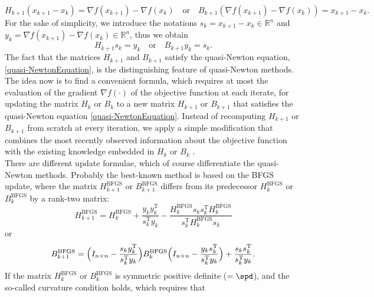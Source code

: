 \begin{equation*}
    H_{k+1} (x_{k+1} - x_k) = \nabla f(x_{k+1}) - \nabla f(x_k) \quad \text{or} \quad B_{k+1} (\nabla f(x_{k+1}) - \nabla f(x_k)) = x_{k+1} - x_k.
\end{equation*}
For the sake of simplicity, we introduce the notations $s_k = x_{k+1} - x_k \in \mathbb{R}^n$ and $y_k = \nabla f(x_{k+1}) - \nabla f(x_k) \in \mathbb{R}^n$, thus we obtain
\begin{equation}\label{quasi-NewtonEquation}
    H_{k+1} s_k = y_k \quad \text{or} \quad B_{k+1} y_k = s_k.
\end{equation}
The fact that the matrices $H_{k+1}$ and $B_{k+1}$ satisfy the quasi-Newton equation, \cref{quasi-NewtonEquation}, is the distinguishing feature of quasi-Newton methods. \\
The idea now is to find a convenient formula, which requires at most the evaluation of the gradient $\nabla f(\cdot)$ of the objective function at each iterate, for updating the matrix $H_k$ or $B_k$ to a new matrix $H_{k+1}$ or $B_{k+1}$ that satisfies the quasi-Newton equation \cref{quasi-NewtonEquation}. Instead of recomputing $H_{k+1}$ or $B_{k+1}$ from scratch at every iteration, we apply a simple modification that combines the most recently observed information about the objective function with the existing knowledge embedded in $H_k$ or $B_k$ \cite[p.~139]{NocedalWright:2006}. \\
There are different update formulae, which of course differentiate the quasi-Newton methods. Probably the best-known method is based on the BFGS update, where the matrix $H^{\mathrm{BFGS}}_{k+1}$ or $B^{\mathrm{BFGS}}_{k+1}$ differs from its predecessor $H^{\mathrm{BFGS}}_k$ or $B^{\mathrm{BFGS}}_k$ by a rank-two matrix:
\begin{equation}\label{DirectBFGSformula}
    H^{\mathrm{BFGS}}_{k+1} = H^{\mathrm{BFGS}}_k + \frac{y_k y^{\mathrm{T}}_k}{s^{\mathrm{T}}_k y_k} - \frac{H^{\mathrm{BFGS}}_k s_k s^{\mathrm{T}}_k H^{\mathrm{BFGS}}_k}{s^{\mathrm{T}}_k H^{\mathrm{BFGS}}_k s_k}
\end{equation}
or 
\begin{equation}\label{InverseBFGSformula}
    B^{\mathrm{BFGS}}_{k+1} = \Big{(} I_{n \times n} - \frac{s_k y^{\mathrm{T}}_k}{s_k^{\mathrm{T}} y_k} \Big{)} B^{\mathrm{BFGS}}_k \Big{(} I_{n \times n} - \frac{y_k s^{\mathrm{T}}_k}{s_k^{\mathrm{T}} y_k} \Big{)} + \frac{s_k s^{\mathrm{T}}_k}{s_k^{\mathrm{T}} y_k}.
\end{equation}
If the matrix $H^{\mathrm{BFGS}}_k$ or $B^{\mathrm{BFGS}}_k$ is symmetric positive definite ($= \spd$), and the so-called curvature condition holds, which requires that 
